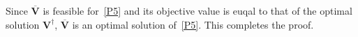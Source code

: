 \documentclass[12pt, draftclsnofoot, onecolumn]{IEEEtran}
\DeclareMathOperator{\diag}{diag}
\begin{document}
Since $\overline{\mathbf{V}}$ is feasible for~\eqref{P5} and its objective value is euqal to that of the optimal solution $\mathbf{V}^\dag$, $\overline{\mathbf{V}}$ is an optimal solution of~\eqref{P5}. This completes the proof.

\end{document}

